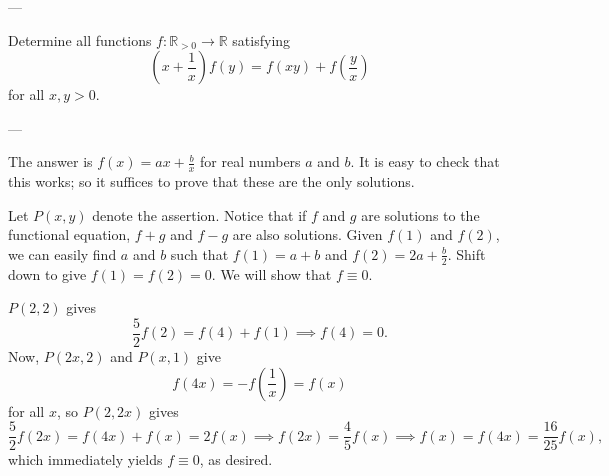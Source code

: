 
---

Determine all functions $f:\mathbb R_{>0}\to\mathbb  R$ satisfying \[\left(x+\frac1x\right)f(y)=f(xy)+f\left(\frac yx\right)\]
for all $x,y>0$.

---

The answer is $f(x)=ax+\tfrac bx$ for real numbers $a$ and $b$. It is easy to check that this works; so it suffices to prove that these are the only solutions.

Let $P(x,y)$ denote the assertion. Notice that if $f$ and $g$ are solutions to the functional equation, $f+g$ and $f-g$ are also solutions. Given $f(1)$ and $f(2)$, we can easily find $a$ and $b$ such that $f(1)=a+b$ and $f(2)=2a+\tfrac b2$. Shift down to give $f(1)=f(2)=0$. We will show that $f\equiv 0$.

$P(2,2)$ gives \[\frac52f(2)=f(4)+f(1)\implies f(4)=0.\]
Now, $P(2x,2)$ and $P(x,1)$ give \[f(4x)=-f\left(\frac1x\right)=f(x)\]
for all $x$, so $P(2,2x)$ gives \[\frac52f(2x)=f(4x)+f(x)=2f(x)\implies f(2x)=\frac45f(x)\implies f(x)=f(4x)=\frac{16}{25}f(x),\]
which immediately yields $f\equiv0$, as desired.
